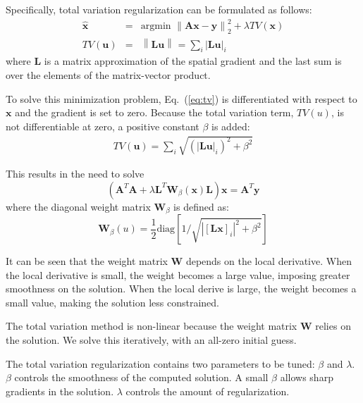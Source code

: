 Specifically, total variation regularization can be formulated as follows:
%
\begin{eqnarray}
     \mathbf{\hat{x}} &=& \mbox{argmin   } \left\|\mathbf{A}\mathbf{x} -
     \mathbf{y}\right\|^2_{2} + \lambda TV(\mathbf{x}) \label{eq:tv} \\
     TV(\mathbf{u}) &=&  \left\| \mathbf{L}\mathbf{u} \right\|_{} = \sum_i |\mathbf{L}\mathbf{u}|_i \label{eq:tv-term}
\end{eqnarray}
%
\noindent where $\mathbf{L}$ is a matrix approximation of the spatial gradient and
the last sum is over the elements of the matrix-vector product.


To solve this minimization problem, Eq.~(\ref{eq:tv}) is differentiated
with respect to $\mathbf{x}$ and the gradient is set to zero. Because the total variation term, $TV(u)$, is not differentiable at zero, a positive constant $\beta$ is added:
%
\begin{eqnarray} \label{eqn:tv-term2}
TV(\mathbf{u}) = \sum_i \sqrt{(|\mathbf{L}\mathbf{u}|_i)^2 + \beta^2}
\end{eqnarray}

This results in the need to solve
%
\begin{equation}\label{eq:tv3}
(\mathbf{A}^T\mathbf{A}+\lambda
\mathbf{L}^T\mathbf{W}_{\beta}(\mathbf{x})\mathbf{L}) \mathbf{x} =
\mathbf{A}^T\mathbf{y}
\end{equation}
%
\noindent where the diagonal weight matrix $\mathbf{W}_{\beta}$ is defined as:
%
\begin{equation} \label{eq:tv-weightmat}
\mathbf{W}_{\beta}(u) = \frac{1}{2} \mbox{diag} \left[ 1 / \sqrt{|[\mathbf{L}\mathbf{x}]_i|^2 + \beta^2}\right]
\end{equation}

It can be seen that the weight matrix $\mathbf{W}$ depends on the local
derivative. When the local derivative is small, the weight becomes a large
value, imposing greater smoothness on the solution. When the local derive
is large, the weight becomes a small value, making the solution less
constrained.

The total variation method is non-linear because the weight matrix
$\mathbf{W}$ relies on the solution. We solve this iteratively, with an all-zero initial
guess.

The total variation regularization contains two parameters to be tuned:
$\beta$ and $\lambda$. $\beta$ controls the smoothness of the computed
solution. A small $\beta$ allows sharp gradients in the solution. $\lambda$
controls the amount of regularization.


